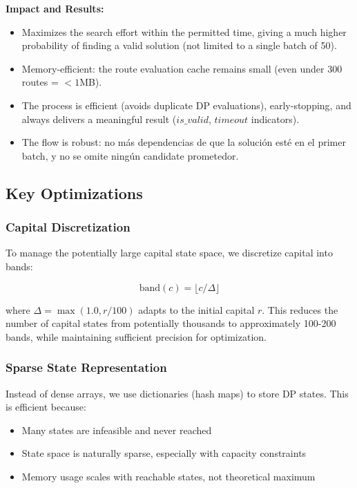 \documentclass[12pt]{article}
\begin{document}
\textbf{Impact and Results:}
\begin{itemize}
    \item Maximizes the search effort within the permitted time, giving a much higher probability of finding a valid solution (not limited to a single batch of 50).
    \item Memory-efficient: the route evaluation cache remains small (even under 300 routes = $<1$MB).
    \item The process is efficient (avoids duplicate DP evaluations), early-stopping, and always delivers a meaningful result ($is\_valid$, $timeout$ indicators).
    \item The flow is robust: no más dependencias de que la solución esté en el primer batch, y no se omite ningún candidate prometedor.
\end{itemize}


\subsection{Key Optimizations}

\subsubsection{Capital Discretization}

To manage the potentially large capital state space, we discretize capital into bands:

$$\text{band}(c) = \lfloor c / \Delta \rfloor$$

where $\Delta = \max(1.0, r / 100)$ adapts to the initial capital $r$. This reduces the number of capital states from potentially thousands to approximately 100-200 bands, while maintaining sufficient precision for optimization.

\subsubsection{Sparse State Representation}

Instead of dense arrays, we use dictionaries (hash maps) to store DP states. This is efficient because:
\begin{itemize}
    \item Many states are infeasible and never reached
    \item State space is naturally sparse, especially with capacity constraints
    \item Memory usage scales with reachable states, not theoretical maximum
\end{itemize}
\end{document}
